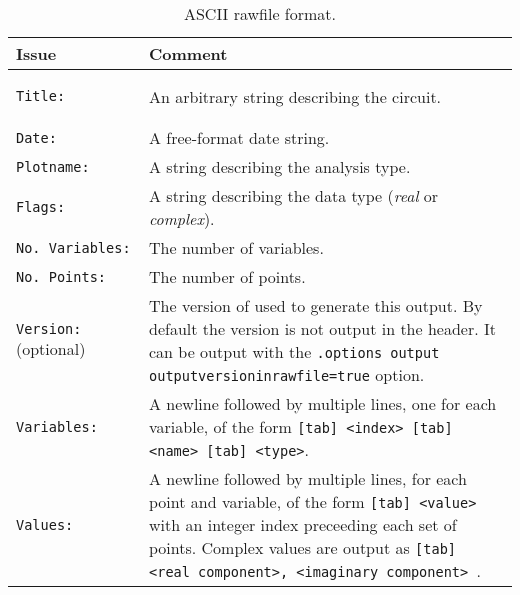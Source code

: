 \begin{longtable}[h] {>{\raggedright\small}m{1.5in}|>{\raggedright\let\\\tabularnewline\small}m{4.5in}}
  \caption{\Xyce{} ASCII rawfile format.} \\ \hline
  \rowcolor{XyceDarkBlue}
  \color{white}\bf Issue & 
  \color{white}\bf Comment \\ \hline \endfirsthead  
  \label{table_rawformatascii}

    \texttt{Title:} & 
    An arbitrary string describing the circuit.
    \\ \hline

    \texttt{Date:} & 
    A free-format date string.
    \\ \hline

    \texttt{Plotname:} & 
    A string describing the analysis type.
    \\ \hline

    \texttt{Flags:} & 
    A string describing the data type (\emph{real} or \emph{complex}).
    \\ \hline

    \texttt{No.~Variables:} & 
    The number of variables.
    \\ \hline

    \texttt{No.~Points:} & 
    The number of points.
    \\ \hline
    
    \texttt{Version:} (optional) &
    The version of \Xyce{} used to generate this output. By default the version is not output in the header.  It can 
    be output with the \texttt{.options output outputversioninrawfile=true} option.
    \\ \hline

    \texttt{Variables:} & 
    A newline followed by multiple lines, one for each variable, of the form 
    \texttt{[tab] <index> [tab] <name> [tab] <type>}.
    \\ \hline

    \texttt{Values:} & 
    A newline followed by multiple lines, for each point and variable, of the form
    \texttt{[tab] <value> }
    with an integer index preceeding each set of points.  Complex values are output 
    as \texttt{[tab] <real component>, <imaginary component> }.
    \\ \hline

\end{longtable}



